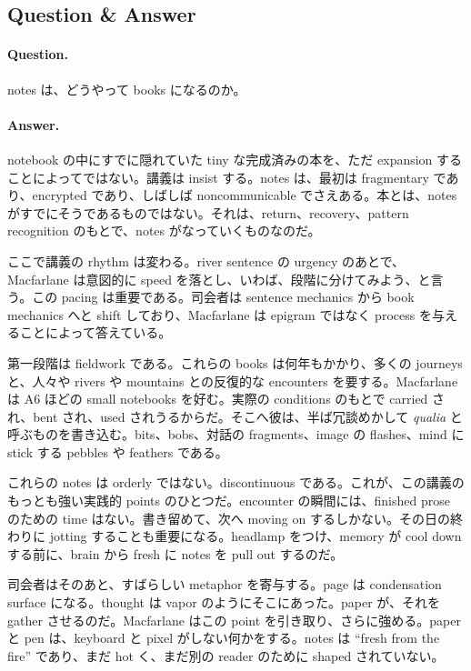 \subsection{Question \& Answer}

\paragraph{Question.} notes は、どうやって books になるのか。

\paragraph{Answer.} notebook の中にすでに隠れていた tiny な完成済みの本を、ただ expansion することによってではない。講義は insist する。notes は、最初は fragmentary であり、encrypted であり、しばしば noncommunicable でさえある。本とは、notes がすでにそうであるものではない。それは、return、recovery、pattern recognition のもとで、notes がなっていくものなのだ。

ここで講義の rhythm は変わる。river sentence の urgency のあとで、Macfarlane は意図的に speed を落とし、いわば、段階に分けてみよう、と言う。この pacing は重要である。司会者は sentence mechanics から book mechanics へと shift しており、Macfarlane は epigram ではなく process を与えることによって答えている。

第一段階は fieldwork である。これらの books は何年もかかり、多くの journeys と、人々や rivers や mountains との反復的な encounters を要する。Macfarlane は A6 ほどの small notebooks を好む。実際の conditions のもとで carried され、bent され、used されうるからだ。そこへ彼は、半ば冗談めかして \emph{qualia} と呼ぶものを書き込む。bits、bobs、対話の fragments、image の flashes、mind に stick する pebbles や feathers である。

これらの notes は orderly ではない。discontinuous である。これが、この講義のもっとも強い実践的 points のひとつだ。encounter の瞬間には、finished prose のための time はない。書き留めて、次へ moving on するしかない。その日の終わりに jotting することも重要になる。headlamp をつけ、memory が cool down する前に、brain から fresh に notes を pull out するのだ。

司会者はそのあと、すばらしい metaphor を寄与する。page は condensation surface になる。thought は vapor のようにそこにあった。paper が、それを gather させるのだ。Macfarlane はこの point を引き取り、さらに強める。paper と pen は、keyboard と pixel がしない何かをする。notes は ``fresh from the fire'' であり、まだ hot く、まだ別の reader のために shaped されていない。

